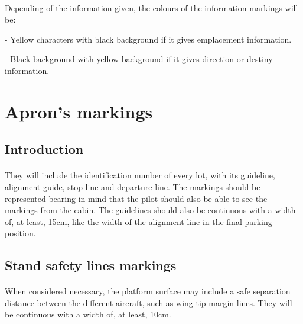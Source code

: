 		\paragraph{}Depending of the information given, the colours of the information markings will be:
		
		-	Yellow characters with black background if it gives emplacement information.
		
		-	Black background with yellow background if it gives direction or destiny information.
	
	\section{Apron's markings} 
		\subsection{Introduction}
		\paragraph{}They will include the identification number of every lot, with its guideline, alignment guide, stop line and departure line. The markings should be represented bearing in mind that the pilot should also be able to see the markings from the cabin. The guidelines should also be continuous with a width of, at least, 15cm, like the width of the alignment line in the final parking position.

		\subsection{Stand safety lines markings}
		\paragraph{}When considered necessary, the platform surface may include a safe separation distance between the different aircraft, such as wing tip margin lines. They will be continuous with a width of, at least, 10cm.

		
	